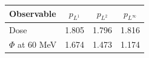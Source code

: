 \begin{tabular}{lccc}
\toprule
Observable & $p_{L^1}$ & $p_{L^2}$ & $p_{L^\infty}$ \\
\midrule
Dose & 1.805 & 1.796 & 1.816 \\
$\Phi$ at 60 MeV & 1.674 & 1.473 & 1.174 \\
\bottomrule
\end{tabular}
